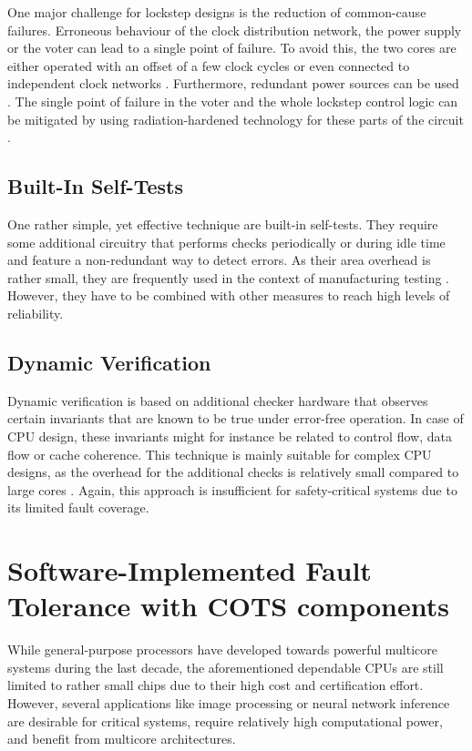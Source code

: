 \documentclass[conference]{IEEEtran}
\begin{document}
One major challenge for lockstep designs is the reduction of common-cause failures. Erroneous behaviour of the clock distribution network, the power supply or the voter can lead to a single point of failure. To avoid this, the two cores are either operated with an offset of a few clock cycles \cite{Iturbe2019} or even connected to independent clock networks \cite{Han2017}. Furthermore, redundant power sources can be used \cite{Han2017}. The single point of failure in the voter and the whole lockstep control logic can be mitigated by using radiation-hardened technology for these parts of the circuit \cite{Iturbe2019}.

\subsection{Built-In Self-Tests}

One rather simple, yet effective technique are built-in self-tests. They require some additional circuitry that performs checks periodically or during idle time and feature a non-redundant way to detect errors. As their area overhead is rather small, they are frequently used in the context of manufacturing testing \cite{Gizopoulos2011}. However, they have to be combined with other measures to reach high levels of reliability.

\subsection{Dynamic Verification}

Dynamic verification is based on additional checker hardware that observes certain invariants that are known to be true under error-free operation. In case of CPU design, these invariants might for instance be related to control flow, data flow or cache coherence. This technique is mainly suitable for complex CPU designs, as the overhead for the additional checks is relatively small compared to large cores \cite{Gizopoulos2011}. Again, this approach is insufficient for safety-critical systems due to its limited fault coverage.


\section{Software-Implemented Fault Tolerance with COTS components}
\label{sec:software}

While general-purpose processors have developed towards powerful multicore systems during the last decade, the aforementioned dependable CPUs are still limited to rather small chips due to their high cost and certification effort. However, several applications like image processing or neural network inference are desirable for critical systems, require relatively high computational power, and benefit from multicore architectures.
\end{document}
